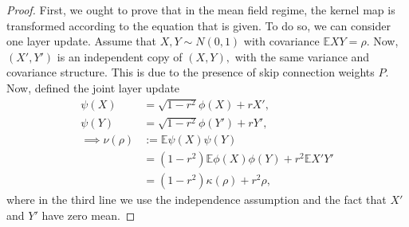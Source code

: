 \documentclass[twoside]{article}
\newcommand{\E}{\mathbb{E}}
\theoremstyle{definition}
\begin{document}
\begin{proof}
First, we ought to prove that in the mean field regime, the kernel map is transformed according to the equation that is given. To do so, we can consider one layer update. Assume that $X,Y\sim N(0,1)$ with covariance $\E XY = \rho.$ Now, $(X',Y')$ is an independent copy of $(X,Y),$ with the same variance and covariance structure. This is due to the presence of skip connection weights $P.$ Now, defined the joint layer update 
\begin{align*}
\psi(X) &= \sqrt{1-r^2} \phi(X)  + r X',\\
\psi(Y) &= \sqrt{1-r^2} \phi(Y')  + r Y',\\
\implies \nu(\rho)&:= \E \psi(X)\psi(Y) \\
&=  (1-r^2) \E \phi(X)\phi(Y) + r^2 \E X' Y' \\
    &= (1-r^2) \kappa(\rho) + r^2 \rho,
\end{align*}
where in the third line we use the independence assumption and the fact that $X'$ and $Y'$ have zero mean. 


\end{proof}
\end{document}
